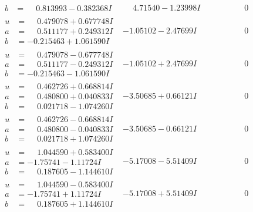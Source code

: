 \documentclass[1p]{elsarticle_modified}
\theoremstyle{definition}
\begin{document}
$$\begin{array}{c|c|c}
\begin{aligned}
b &= \phantom{-}0.813993 - 0.382368 I\end{aligned}
 & \phantom{-}4.71540 - 1.23998 I & \phantom{-0.000000 } 0 \\ \hline\begin{aligned}
u &= \phantom{-}0.479078 + 0.677748 I \\
a &= \phantom{-}0.511177 + 0.249312 I \\
b &= -0.215463 + 1.061590 I\end{aligned}
 & -1.05102 - 2.47699 I & \phantom{-0.000000 } 0 \\ \hline\begin{aligned}
u &= \phantom{-}0.479078 - 0.677748 I \\
a &= \phantom{-}0.511177 - 0.249312 I \\
b &= -0.215463 - 1.061590 I\end{aligned}
 & -1.05102 + 2.47699 I & \phantom{-0.000000 } 0 \\ \hline\begin{aligned}
u &= \phantom{-}0.462726 + 0.668814 I \\
a &= \phantom{-}0.480800 + 0.040833 I \\
b &= \phantom{-}0.021718 - 1.074260 I\end{aligned}
 & -3.50685 + 0.66121 I & \phantom{-0.000000 } 0 \\ \hline\begin{aligned}
u &= \phantom{-}0.462726 - 0.668814 I \\
a &= \phantom{-}0.480800 - 0.040833 I \\
b &= \phantom{-}0.021718 + 1.074260 I\end{aligned}
 & -3.50685 - 0.66121 I & \phantom{-0.000000 } 0 \\ \hline\begin{aligned}
u &= \phantom{-}1.044590 + 0.583400 I \\
a &= -1.75741 - 1.11724 I \\
b &= \phantom{-}0.187605 - 1.144610 I\end{aligned}
 & -5.17008 - 5.51409 I & \phantom{-0.000000 } 0 \\ \hline\begin{aligned}
u &= \phantom{-}1.044590 - 0.583400 I \\
a &= -1.75741 + 1.11724 I \\
b &= \phantom{-}0.187605 + 1.144610 I\end{aligned}
 & -5.17008 + 5.51409 I & \phantom{-0.000000 } 0 \\ \hline\begin{aligned}

\end{aligned}
\end{array}$$
\end{document}
